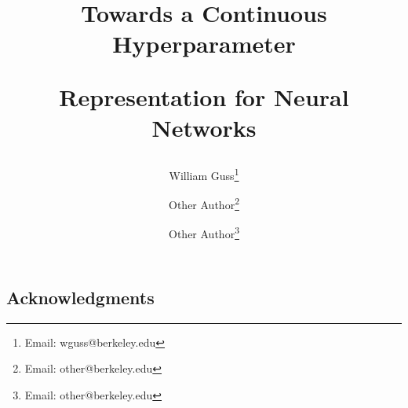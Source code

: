 \documentclass[12pt]{article}
\title{
 \begin{minipage}[c]{1.05\textwidth}
 	\centerline{Towards a Continuous Hyperparameter}
 	\centerline{Representation for Neural Networks}
 \end{minipage}
}
\author{
	\vspace{1cm}
	William Guss\thanks{Email: wguss@berkeley.edu} \and
	Other Author\thanks{Email: other@berkeley.edu} \and 
	Other Author\thanks{Email: other@berkeley.edu}
}
\newif\ifdraft
\begin{document}
\maketitle
\thispagestyle{empty}

\begin{abstract}
% 
\end{abstract}

\ifdraft
\newpage

\fi

\newpage
\thispagestyle{empty}

{\large
{}
\vspace*{\fill}
\tableofcontents
\vspace*{\fill}
}

\newpage

\setcounter{page}{1}




% 
% 
% 
% 
% 
% 
% 

\ifdraft
\appendix
% 
\fi

\subsection*{Acknowledgments}



\end{document}
